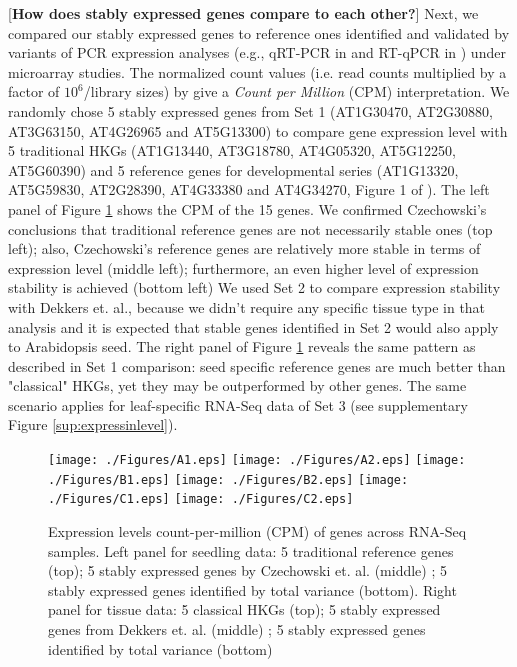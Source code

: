 \documentclass[11pt, a4paper]{article}
\begin{document}
[\textbf{How does stably expressed genes compare to each other?}]
Next, we compared our stably expressed genes to reference ones identified and validated by variants of PCR expression analyses (e.g., qRT-PCR in \cite{czechowski2005genome} and RT-qPCR in \cite{dekkers2012identification}) under microarray studies. The normalized count values  (i.e. read counts multiplied by a factor of  $10^6$/library sizes) by \cite{anders2013count} give a \textit{Count per Million} (CPM) interpretation.  We randomly chose 5 stably expressed genes from Set 1 (AT1G30470, AT2G30880, AT3G63150, AT4G26965 and AT5G13300) to compare gene expression level with 5 traditional HKGs  (AT1G13440, AT3G18780, AT4G05320, AT5G12250, AT5G60390) and 5  reference genes  for developmental series (AT1G13320, AT5G59830, AT2G28390, AT4G33380 and AT4G34270, Figure 1 of \cite{czechowski2005genome}). The left panel of  Figure \ref{expressinlevel} shows the CPM of the 15 genes. We confirmed Czechowski's conclusions that traditional reference genes are not necessarily stable ones (top left); also, Czechowski's reference genes are relatively more stable in terms of expression level (middle left); furthermore, an even higher level of expression stability is achieved (bottom left)%
 We used Set 2 to compare expression stability with Dekkers et. al., because we didn't require any specific tissue type in that analysis and  it is expected that stable genes identified in Set 2 would also apply to Arabidopsis seed. The right panel of Figure \ref{expressinlevel} reveals the same pattern as described in Set 1 comparison: seed specific reference genes are much better than "classical" HKGs, yet they may be outperformed by other genes.  The same scenario applies for leaf-specific RNA-Seq data of Set 3 (see supplementary Figure \ref{sup:expressinlevel}).  %

 \begin{figure}[H]
\begin{center}
\texttt{[image: ./Figures/A1.eps]}
\texttt{[image: ./Figures/A2.eps]}
\texttt{[image: ./Figures/B1.eps]}
\texttt{[image: ./Figures/B2.eps]}
\texttt{[image: ./Figures/C1.eps]}
\texttt{[image: ./Figures/C2.eps]}

\caption{{\small{\label{expressinlevel} Expression levels  count-per-million (CPM) of genes across RNA-Seq samples. Left panel for seedling data:  5 traditional reference genes (top)};  5 stably expressed genes by Czechowski et. al. (middle) ; 5 stably expressed genes identified by total variance (bottom). Right panel for tissue data: 5 classical HKGs (top);  5 stably expressed genes from Dekkers et. al. (middle) ; 5 stably expressed genes identified by total variance (bottom) }}
\end{center}
\end{figure} 
\end{document}
